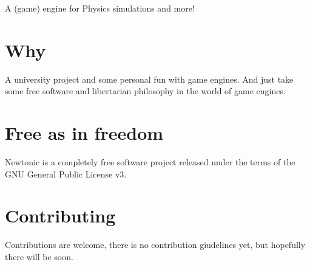 A (game) engine for Physics simulations and more!

\section*{Why}

A university project and some personal fun with game engines. And just take some free software and libertarian philosophy in the world of game engines.

\section*{Free as in freedom}

Newtonic is a completely free software project released under the terms of the G\+NU General Public License v3.

\section*{Contributing}

Contributions are welcome, there is no contribution giudelines yet, but hopefully there will be soon. 